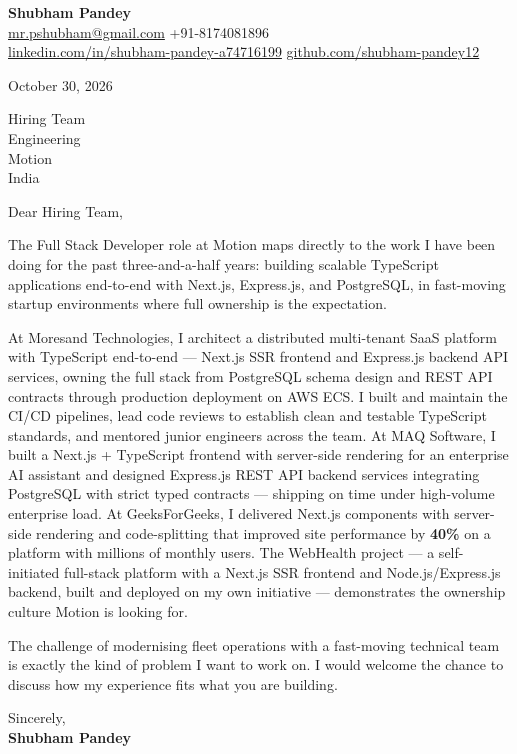 \documentclass[a4paper,11pt]{article}
\begin{document}
\textbf{\Large Shubham Pandey}\\
\href{mailto:mr.pshubham@gmail.com}{mr.pshubham@gmail.com} \quad +91-8174081896\\
\href{https://www.linkedin.com/in/shubham-pandey-a74716199/}{linkedin.com/in/shubham-pandey-a74716199} \quad
\href{https://github.com/shubham-pandey12}{github.com/shubham-pandey12}

\vspace{1em}
October 30, 2026

\vspace{1em}
Hiring Team\\
Engineering\\
Motion\\
India

\vspace{1em}
Dear Hiring Team,

The Full Stack Developer role at Motion maps directly to the work I have been doing for the past three-and-a-half years: building scalable TypeScript applications end-to-end with Next.js, Express.js, and PostgreSQL, in fast-moving startup environments where full ownership is the expectation.

At Moresand Technologies, I architect a distributed multi-tenant SaaS platform with TypeScript end-to-end --- Next.js SSR frontend and Express.js backend API services, owning the full stack from PostgreSQL schema design and REST API contracts through production deployment on AWS ECS. I built and maintain the CI/CD pipelines, lead code reviews to establish clean and testable TypeScript standards, and mentored junior engineers across the team. At MAQ Software, I built a Next.js + TypeScript frontend with server-side rendering for an enterprise AI assistant and designed Express.js REST API backend services integrating PostgreSQL with strict typed contracts --- shipping on time under high-volume enterprise load. At GeeksForGeeks, I delivered Next.js components with server-side rendering and code-splitting that improved site performance by \textbf{40\%} on a platform with millions of monthly users. The WebHealth project --- a self-initiated full-stack platform with a Next.js SSR frontend and Node.js/Express.js backend, built and deployed on my own initiative --- demonstrates the ownership culture Motion is looking for.

The challenge of modernising fleet operations with a fast-moving technical team is exactly the kind of problem I want to work on. I would welcome the chance to discuss how my experience fits what you are building.

\vspace{1em}
Sincerely,\\[0.5em]
\textbf{Shubham Pandey}
\end{document}
